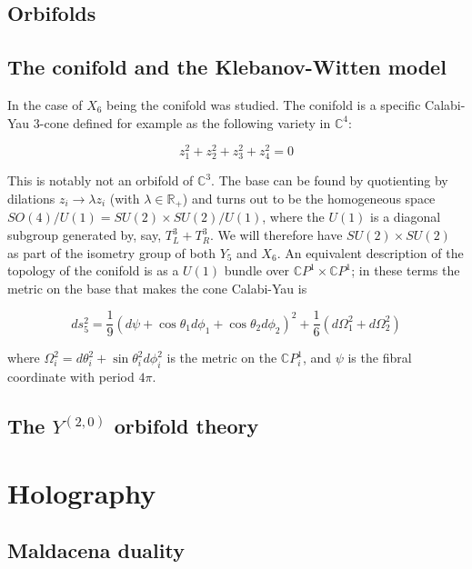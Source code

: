 \documentclass[11pt,a4paper,oneside,openright,titlepage]{book}
\begin{document}
\section{Orbifolds}

\section{The conifold and the Klebanov-Witten model}

In \cite{KW_SCFT} the case of $X_6$ being the conifold was studied. The conifold is a specific Calabi-Yau 3-cone defined for example as the following variety in $\mathbb{C}^4$:

\begin{equation}
	z_1^2 + z_2^2 + z_3^2 + z_4^2 = 0
\end{equation}

This is notably not an orbifold of $\mathbb{C}^3$. The base can be found by quotienting by dilations $z_i \rightarrow \lambda z_i$ (with $\lambda \in \mathbb{R}_+$) and turns out to be the homogeneous space $SO(4)/U(1) = SU(2)\times SU(2) / U(1)$, where the $U(1)$ is a diagonal subgroup generated by, say, $T^3_L + T^3_R$. We will therefore have $SU(2)\times SU(2)$ as part of the isometry group of both $Y_5$ and $X_6$. An equivalent description of the topology of the conifold is as a $U(1)$ bundle over $\mathbb{C}P^1 \times \mathbb{C}P^1$; in these terms the metric on the base that makes the cone Calabi-Yau is

\begin{equation}
	ds^2_5 = \frac{1}{9} (d\psi + \cos\theta_1 d\phi_1 + \cos\theta_2 d\phi_2)^2 + \frac{1}{6} (d\Omega_1^2 + d\Omega_2^2)
\end{equation}

where $\Omega_i^2 = d\theta_i^2 + \sin\theta_i^2 d\phi_i^2$ is the metric on the $\mathbb{C}P^1_i$, and $\psi$ is the fibral coordinate with period $4\pi$.


\section{The $Y^{(2,0)}$ orbifold theory}


\chapter{Holography}

\section{Maldacena duality}
\end{document}
